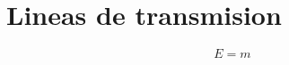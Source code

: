 \documentclass[12pt,letterpaper]{article}
\begin{document}
\newpage
\section{Lineas de transmision}
\begin{equation}
    E=m
\end{equation}
\end{document}
